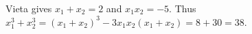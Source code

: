 Vieta gives $x_1+x_2=2$ and $x_1x_2=-5$. Thus $x_1^3+x_2^3=(x_1+x_2)^3-3x_1x_2(x_1+x_2)=8+30=\boxed{38}$.
